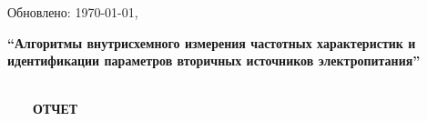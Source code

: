 \newcommand{\theplace}{Санкт-Петербург}
\newcommand{\theyear}{2026}
\newcommand{\thetype}{ОТЧЕТ}
\newcommand{\thename}{``Алгоритмы внутрисхемного измерения частотных характеристик и идентификации параметров вторичных источников электропитания''}
\thispagestyle{empty}

Обновлено: \today,~\DTMcurrenttime
\begin{center}
    \textbf{\thename}\\
    \ \ \ \ \ \par\ \ \ \
    \MakeUppercase{\textbf{\thetype}}
\end{center}

